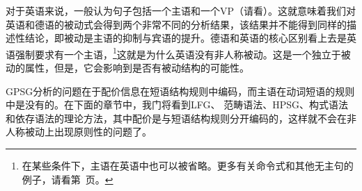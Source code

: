 对于英语来说，一般认为句子包括一个主语和一个VP（请看\citealp[]{GKPS85a}）。这就意味着我们对英语和德语的被动式会得到两个非常不同的分析结果，该结果并不能得到同样的描述性结论，即被动是主语的抑制与宾语的提升。德语和英语的核心区别看上去是英语强制要求有一个主语，\footnote{
在某些条件下，主语在英语中也可以被省略。更多有关命令式和其他无主句的例子，请看第~\pageref{Beispiel-Imperativ-Englisch}页。
}这就是为什么英语没有非人称被动。这是一个独立于被动的属性，但是，它会影响到是否有被动结构的可能性。

GPSG分析的问题在于配价信息在短语结构规则中编码，而主语在动词短语的规则中是没有的。在下面的章节中，我门将看到LFG\indexlfg 、
范畴语法\indexcg 、HPSG\indexhpsg 、构式语法\indexcxg 和依存语法\indexdg 的理论方法，其中配价是与短语结构规则分开编码的，这样就不会在非人称被动上出现原则性的问题了。

